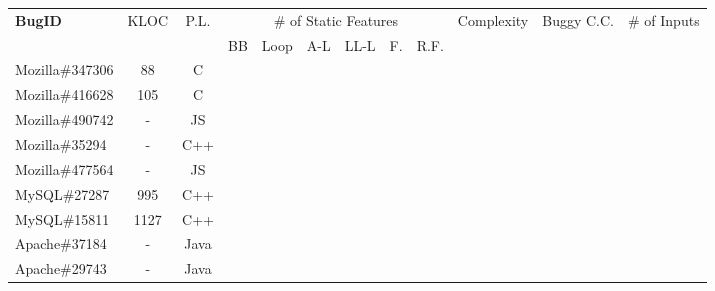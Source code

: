 \begin{table*}[h!]
  \centering
  \scriptsize
  \newcommand{\Yes}[1]{\checkmark{}$_#1$}
  \newcommand{\No}[0]{-}
  \begin{tabular}{lccccccccccc}
    \toprule
    {\bf BugID}                   & KLOC  &  P.L.    & \multicolumn{6}{c}{\# of Static Features}                                          &   Complexity  & Buggy C.C.        & \# of Inputs \\

    \cmidrule(lr){4-9}
                                 &        &          &  BB      &  Loop     & A-L    &  LL-L    &  F.  & R.F.                             &               &                             & \\
    \midrule

    Mozilla\#347306              &  88    & C        &          &           &       &           &       &                                 &               &&         \\
    Mozilla\#416628              &  105   & C        &          &           &       &           &       &                                 &               &&                \\
    Mozilla\#490742                  &  -  & JS  &  &              &    &                                 &                   &                           &       &&                         \\
    Mozilla\#35294    &  -  & C++  &  &              &    &                                 &                   &                           &                     &&          \\
    Mozilla\#477564   &  -  & JS  &  &              &    &                                 &                   &                           &                      &&          \\
    \midrule
    MySQL\#27287      &  995  & C++  &  &              &    &                                 &                   &                           &                   &&             \\
    MySQL\#15811      &  1127 & C++  &  &              &    &                                 &                   &                           &                   &&             \\
    \midrule
    Apache\#37184     &  -  & Java  &  &              &    &                                 &                   &                           &                    &&           \\
    Apache\#29743     &  -  & Java  &  &              &    &                                 &                   &                           &                    &&          \\

\end{tabular}
\end{table*}
